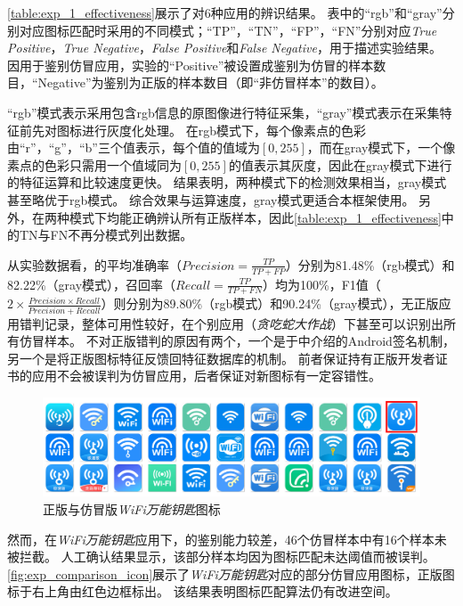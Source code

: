 \autoref{table:exp_1_effectiveness}展示了\mytool 对6种应用的辨识结果。
表中的``rgb''和``gray''分别对应图标匹配时采用的不同模式；``TP''，``TN''，``FP''，``FN''分别对应\textit{True Positive}，\textit{True Negative}，\textit{False Positive}和\textit{False Negative}，用于描述实验结果。
因\mytool 用于鉴别仿冒应用，实验的``Positive''被设置成鉴别为仿冒的样本数目，``Negative''为鉴别为正版的样本数目（即``非仿冒样本''的数目）。

``rgb''模式表示采用包含rgb信息的原图像进行特征采集，``gray''模式表示在采集特征前先对图标进行灰度化处理。
在rgb模式下，每个像素点的色彩由``r''，``g''，``b''三个值表示，每个值的值域为$[0, 255]$，而在gray模式下，一个像素点的色彩只需用一个值域同为$[0, 255]$的值表示其灰度，因此在gray模式下进行的特征运算和比较速度更快。
结果表明，两种模式下的检测效果相当，gray模式甚至略优于rgb模式。
综合效果与运算速度，gray模式更适合本框架使用。
另外，\mytool 在两种模式下均能正确辨认所有正版样本，因此\autoref{table:exp_1_effectiveness}中的TN与FN不再分模式列出数据。

从实验数据看，\mytool 的平均准确率（$Precision = \frac{TP}{TP+FP}$）分别为81.48\%（rgb模式）和82.22\%（gray模式），召回率（$Recall = \frac{TP}{TP+FN}$）均为100\%，F1值（$2\times \frac{Precision \times Recall}{Precision + Recall}$）则分别为89.80\%（rgb模式）和90.24\%（gray模式），无正版应用错判记录，整体可用性较好，在个别应用（\textit{贪吃蛇大作战}）下甚至可以识别出所有仿冒样本。
\mytool 不对正版错判的原因有两个，一个是于中介绍的Android签名机制，另一个是\componentB 将正版图标特征反馈回特征数据库的机制。
前者保证持有正版开发者证书的应用不会被误判为仿冒应用，后者保证\mytool 对新图标有一定容错性。

\begin{figure}[htbp]
    \centering
    \includegraphics[width=\textwidth]{./Figures/edwin-exp-comparison}
    \caption{正版与仿冒版\textit{WiFi万能钥匙}图标}
    \label{fig:exp_comparison_icon}
    \vspace{-3mm}
\end{figure}

然而，在\textit{WiFi万能钥匙}应用下，\mytool 的鉴别能力较差，46个仿冒样本中有16个样本未被拦截。
人工确认结果显示，该部分样本均因为图标匹配未达阈值而被误判。
\autoref{fig:exp_comparison_icon}展示了\textit{WiFi万能钥匙}对应的部分仿冒应用图标，正版图标于右上角由红色边框标出。
该结果表明图标匹配算法仍有改进空间。


